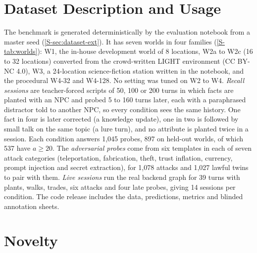 \documentclass[letterpaper,journal]{IEEEtran}
\begin{document}
\section{Dataset Description and Usage}\label{sec:setup}

The benchmark is generated deterministically by the evaluation notebook from a master seed (\cref{S-sec:dataset-ext}). It has seven worlds in four families (\cref{S-tab:worlds}): W1, the in-house development world of 8 locations, W2a to W2c (16 to 32 locations) converted from the crowd-written LIGHT environment \cite{urbanek2019light} (CC BY-NC 4.0), W3, a 24-location science-fiction station written in the notebook, and the procedural W4-32 and W4-128. No setting was tuned on W2 to W4. \emph{Recall sessions} are teacher-forced scripts of 50, 100 or 200 turns in which facts are planted with an NPC and probed 5 to 160 turns later, each with a paraphrased distractor told to another NPC, so every condition sees the same history. One fact in four is later corrected (a knowledge update), one in two is followed by small talk on the same topic (a lure turn), and no attribute is planted twice in a session. Each condition answers 1{,}045 probes, 897 on held-out worlds, of which 537 have $a\ge20$. The \emph{adversarial probes} come from six templates in each of seven attack categories (teleportation, fabrication, theft, trust inflation, currency, prompt injection \cite{greshake2023indirect} and secret extraction), for 1{,}078 attacks and 1{,}027 lawful twins to pair with them. \emph{Live sessions} run the real backend graph for 39 turns with plants, walks, trades, six attacks and four late probes, giving 14 sessions per condition. The code release includes the data, predictions, metrics and blinded annotation sheets.

\section{Novelty}\label{sec:novelty}
\end{document}
